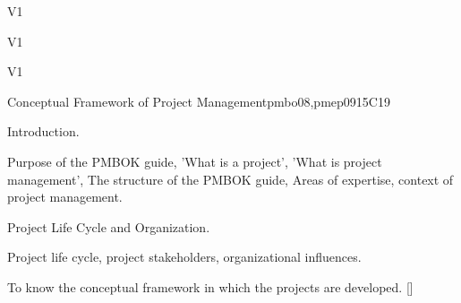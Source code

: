 \begin{syllabus}
\begin{outcomes}{V1}
    \item {}
    \item {}
    \item {}
\end{outcomes}

\begin{specificoutcomes}{V1}
   \item {}
   \item {}
   \item {}
   \item {}
\end{specificoutcomes}


\begin{competences}{V1}
    \item {} 
    \item {}
    \item {}
    \item {}
    \item {}
    \item {}
    \item {}
    \item {}
\end{competences}

\begin{unit}{Conceptual Framework of Project Management}{}{pmbo08,pmep09}{15}{C19}
\begin{topics}
      \item Introduction.
      \item Purpose of the PMBOK guide, 'What is a project', 'What is project management', The structure of the PMBOK guide, Areas of expertise, context of project management.
      \item Project Life Cycle and Organization.
      \item Project life cycle, project stakeholders, organizational influences.
   \end{topics}

   \begin{learningoutcomes}
      \item To know the conceptual framework in which the projects are developed. [\Usage]
   \end{learningoutcomes}
\end{unit}


\end{syllabus}
